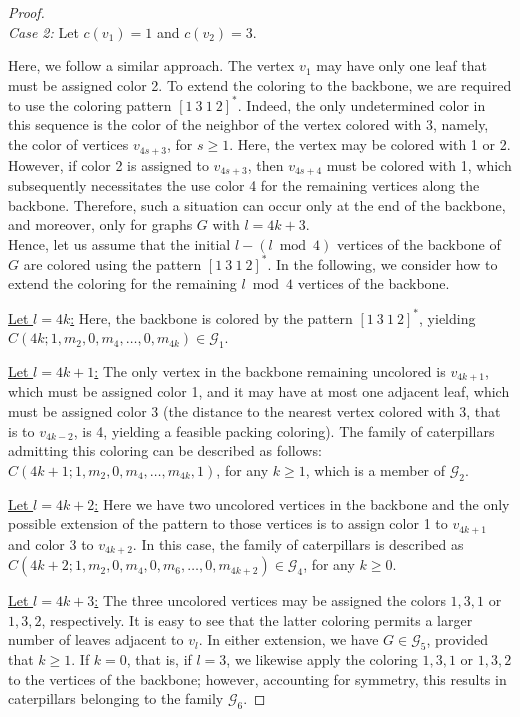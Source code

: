 \documentclass{article}
\begin{document}
\begin{proof}
~~\\
\emph{Case 2:} Let $c(v_1)=1$ and  $c(v_2)=3$.

Here, we follow a similar approach. The vertex $v_1$ may have only one leaf that must be assigned color 2. To extend the coloring to the backbone, we are required to use the coloring pattern $[1\ 3\ 1\  2]^*$. Indeed, the only undetermined color in this sequence is the color of the neighbor of the vertex colored with 3, namely, the color of vertices $v_{4s+3}$, for $s\geq 1$. Here, the vertex may be colored with 1 or 2. However, if color 2 is assigned to $v_{4s+3}$, then $v_{4s+4}$ must be colored with 1, which subsequently necessitates the use color 4 for the remaining vertices along the backbone. Therefore, such a situation can occur only at the end of the backbone, and moreover, only for graphs $G$ with $l=4k+3$.
\\Hence, let us assume that the initial $l - (l \bmod 4)$  vertices of the backbone of $G$ are colored using the pattern $[1\ 3\ 1\ 2]^*$. In the following, we consider how to extend the coloring for the remaining $l \bmod 4$ vertices of the backbone.

\underline{Let $l=4k$:} Here, the backbone is colored by the pattern $[1\ 3\ 1\ 2]^*$, yielding $C(4k;1,m_2,0,m_4,\ldots, 0, m_{4k}) \in \mathcal{G}_{1}$.

\underline{Let $l=4k+1$:} The only vertex  in the backbone remaining uncolored is $v_{4k+1}$, which must be assigned color 1, and it may have at most one adjacent leaf, which must be assigned color 3 (the distance to the nearest vertex colored with 3, that is to $v_{4k-2}$, is 4, yielding a feasible packing coloring). The family of caterpillars admitting this coloring can be described as follows: $C(4k+1; 1, m_2, 0, m_4, \ldots, m_{4k}, 1)$, for any $k\geq 1$, which is a member of $\mathcal{G}_2$.

\underline{Let $l=4k+2$:} Here we have two uncolored vertices in the backbone and the only possible extension of the pattern to those vertices is to assign color 1 to $v_{4k+1}$ and color 3 to $v_{4k+2}$. In this case, the family of caterpillars is described as $C(4k+2;1,m_2,0,m_4,0,m_6, \ldots,0,m_{4k+2}) \in  \mathcal{G}_4$, for any $k\geq 0$.

\underline{Let $l=4k+3$:} The three uncolored vertices may be assigned the colors $1, 3, 1$ or $1,3, 2$, respectively. It is easy to see that the latter coloring permits a larger number of leaves adjacent to $v_l$. In either extension, we have $G\in \mathcal{G}_5$, provided that $k\geq 1$.  If $k=0$, that is, if $l=3$, we likewise apply the coloring  $1, 3, 1$ or $1,3, 2$ to the vertices of the backbone; however, accounting for symmetry, this results in caterpillars belonging to the family $\mathcal{G}_6$.


\end{proof}
\end{document}
